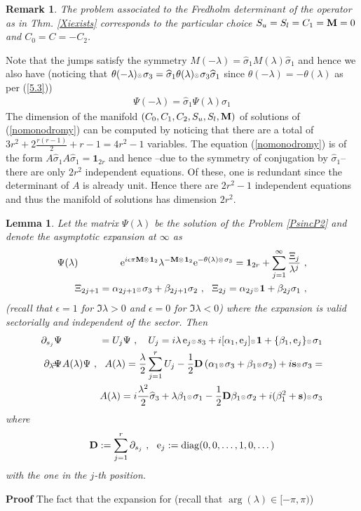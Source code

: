 \documentclass{article}
\def\ss{\mathbf s}
\newtheorem{lemma}{Lemma}[section]
\newtheorem{remark}{Remark}[section]
\def\ot{\hbox{\resizebox{6pt}{!}{$ \otimes \,
$}}}
\def \D{{\mathbf D}}
\def\b{\beta}
\def\br{\begin{remark}}
\def\er{\end{remark}}
\def\s{\sigma}
\def\&{&\hspace{-20pt}}
\def\1{\mathbf 1}
\def\a{{\alpha}}
\def\wh{\widehat}
\def \pa{\partial}
\newcommand{\be}{\begin{eqnarray}}
\newcommand{\ee}{\end{eqnarray}}
\def\le{\left}
\def\ri{\right}
\begin{document}
\br
\label{5.1}
The problem associated to the Fredholm determinant  of the operator as in Thm. \ref{Xiexists} corresponds to the particular choice $S_u=S_l = C_1={\bf M}=0$ and $C_0=C=-C_2$.
\er
Note that the jumps satisfy the symmetry $M(-\lambda) = \wh \s_1 M(\lambda) \wh \s_1$ and hence we also have (noticing that $\theta(-\lambda)\ot \s_3 = \wh \s_1 \theta(\lambda)\ot \s_3 \wh \s_1$ since $\theta(-\lambda)=-\theta(\lambda)$ as per (\ref{5.3})) 
\be
\Psi(-\lambda) = \wh \s_1\Psi(\lambda)\wh \s_1
\ee
The dimension of the manifold $(C_0,C_1,C_2,S_u,S_l, {\bf M})$ of solutions of (\ref{nomonodromy}) can be computed by noticing that there are a total of $3r^2 + 2 \frac {r (r-1)}2 + r-1=4r^2-1$ variables. The equation (\ref{nomonodromy}) is of the form $A\wh \s_1 A\wh \s_1=\1_{2r}$ and hence --due to the symmetry of conjugation by $\wh \s_1$-- there are only $2r^2$ independent equations. Of these, one is redundant since the determinant of $A$ is already unit. Hence there are $2r^2-1$ independent equations and thus the manifold of solutions has dimension $2r^2$. 
%
%
%
\begin{lemma}
\label{nc1}
Let the matrix $\Psi(\lambda)$ be the solution of the Problem \ref{PsincP2} and  denote the asymptotic expansion at $\infty$ as 
\be
\Psi(\lambda)&\& 
{\rm e}^{i\epsilon \pi {\bf M}\ot \1_2}
\lambda^{-{\bf M}\ot \1_2}{\rm e}^{-\theta(\lambda) \ot \s_3}  = \1_{2r} +\sum_{j=1}^\infty\frac{ \Xi_j}{ \lambda^{j}}\ ,\nonumber \\
&\&\ \ \Xi_{2j+1} = \a_{2j+1} \ot \s_3 + \b_{2j+1} \s_2\ ,\ \ \Xi_{2j} = \a_{2j} \ot \1 + \b_{2j} \s_1\ ,
\label{asymptPsi}
\ee
(recall that $\epsilon=1$ for $\Im \lambda>0$ and $\epsilon=0$ for $\Im \lambda<0$)
 where the expansion is valid sectorially and independent of the sector. Then 
\be
\pa_{s_j}  \Psi &\&= U_j \Psi\ ,\ \ \ U_j = i\lambda\, {\mathrm e}_{j} \ot  s_3 +i [\a_1,{\mathrm e}_{j}] \ot\1 + \{\b_1,{\mathrm e}_{j}\} \ot  \s_1\\
\pa_\lambda \Psi &\&= A(\lambda)\Psi\ ,\ \ 
A(\lambda) = \frac \lambda 2  \sum_{j=1}^r U_j -\frac 1 2 \D \le(\a_1 \ot  \s_3 + \b_1 \ot  \s_2\ri) + i \ss\ot \s_3=\\
&\&A(\lambda)= i\frac {\lambda^2}2 \wh \s_3 + \lambda \b_1\ot \s_1 - \frac 1 2 \D \b_1 \ot  \s_2 +i(\b_1^2 + \ss)\ot  \s_3
\label{Amatrix}
\ee
where
\be
\D:= \sum_{j=1}^r \pa_{s_j}\ ,\ \ {\mathrm e}_{j}:={\rm diag}(0,0,\dots, 1,0,\dots) 
\ee
with the one in the $j$-th position.
\end{lemma}
{\bf Proof}
The fact that the expansion for  (recall that $\arg(\lambda)\in [-\pi,\pi)$)
\end{document}
